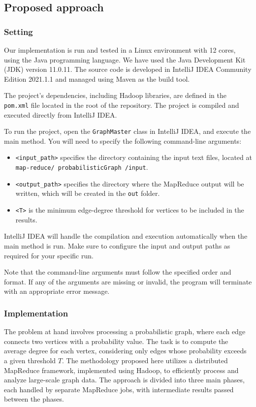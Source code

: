 \documentclass[acmlarge]{acmart}
\begin{document}
  \subsection{Proposed approach}
  \subsubsection{Setting}
  Our implementation is run and tested in a Linux environment with 12 cores, using the Java programming language.
  We have used the Java Development Kit (JDK) version 11.0.11.
  The source code is developed in IntelliJ IDEA Community Edition 2021.1.1 and managed using Maven as the build tool.

  The project’s dependencies, including Hadoop libraries, are defined in the \texttt{pom.xml} file located in the root of
  the repository.
  The project is compiled and executed directly from IntelliJ IDEA.

  To run the project, open the \texttt{GraphMaster} class in IntelliJ IDEA, and execute the main method.
  You will need to specify the following command-line arguments:

  \begin{itemize}
    \item \texttt{<input\_path>} specifies the directory containing the input text files, located at
    \texttt{map-reduce/ probabilisticGraph /input}.
    \item \texttt{<output\_path>} specifies the directory where the MapReduce output will be written, which will be
    created in the \texttt{out} folder.
    \item \texttt{<T>} is the minimum edge-degree threshold for vertices to be included in the results.
  \end{itemize}

  IntelliJ IDEA will handle the compilation and execution automatically when the main method is run.
  Make sure to configure the input and output paths as required for your specific run.

  Note that the command-line arguments must follow the specified order and format.
  If any of the arguments are missing or invalid, the program will terminate with an appropriate error message.

  \subsubsection{Implementation}
  The problem at hand involves processing a probabilistic graph, where each edge connects two vertices with a probability
  value.
  The task is to compute the average degree for each vertex, considering only edges whose probability exceeds a given
  threshold \( T \).
  The methodology proposed here utilizes a distributed MapReduce framework, implemented using Hadoop, to efficiently
  process and analyze large-scale graph data.
  The approach is divided into three main phases, each handled by separate MapReduce jobs, with intermediate results
  passed between the phases.
\end{document}
